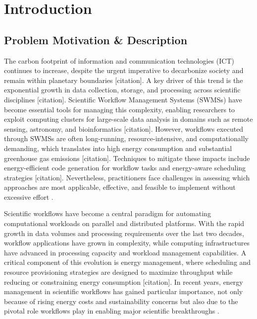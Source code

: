 \section{Introduction}
\label{cha:introduction}

\subsection{Problem Motivation \& Description}
\label{subse:problem_motivation_description}
The carbon footprint of information and communication technologies (ICT) continues to increase, despite the urgent imperative to decarbonize society and remain within planetary boundaries [citation]. A key driver of this trend is the exponential growth in data collection, storage, and processing across scientific disciplines [citation]. Scientific Workflow Management Systems (SWMSs) have become essential tools for managing this complexity, enabling researchers to exploit computing clusters for large-scale data analysis in domains such as remote sensing, astronomy, and bioinformatics [citation]. However, workflows executed through SWMSs are often long-running, resource-intensive, and computationally demanding, which translates into high energy consumption and substantial greenhouse gas emissions [citation]. Techniques to mitigate these impacts include energy-efficient code generation for workflow tasks and energy-aware scheduling strategies [citation]. Nevertheless, practitioners face challenges in assessing which approaches are most applicable, effective, and feasible to implement without excessive effort \cite{thamsen2025energyawareworkflowexecutionoverview}.

Scientific workflows have become a central paradigm for automating computational workloads on parallel and distributed platforms. With the rapid growth in data volumes and processing requirements over the last two decades, workflow applications have grown in complexity, while computing infrastructures have advanced in processing capacity and workload management capabilities. A critical component of this evolution is energy management, where scheduling and resource provisioning strategies are designed to maximize throughput while reducing or constraining energy consumption [citation]. In recent years, energy management in scientific workflows has gained particular importance, not only because of rising energy costs and sustainability concerns but also due to the pivotal role workflows play in enabling major scientific breakthroughs \cite{Coleman_2021}.

